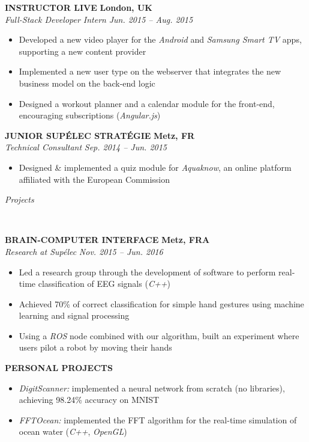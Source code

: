 \documentclass[a4paper, 12pt]{article}
\newcommand{\marginline}{-0.3cm}
\newcommand{\margincontent}{-0.6cm}
\newcommand{\marginbeforesection}{0.35cm}
\newcommand{\linewidthperso}{0.02cm}
\newcommand{\styletitle}[1]{\textbf{#1}}
\newcommand{\styledesc}[1]{\textit{#1}}
\newcommand{\styleloc}[1]{\textbf{#1}}
\newcommand{\styledates}[1]{\textit{#1}}
\newcommand{\stylesection}[1]{
  \vspace{\marginbeforesection}
  \begin{normalsize}\textit{#1}\end{normalsize}
  \vspace{\marginline}\\
  \noindent\makebox[\linewidth]{\rule{\textwidth}{\linewidthperso}}

}
\begin{document}
\begin{footnotesize}
\styletitle{INSTRUCTOR LIVE} \hfill \styleloc{London, UK}\\
\styledesc{Full-Stack Developer Intern} \hfill \styledates{Jun. 2015 -- Aug. 2015}\\
\vspace{\margincontent}
\begin{itemize}
  \item Developed a new video player for the \textit{Android} and \textit{Samsung Smart TV} apps, supporting a new content provider
  \item Implemented a new user type on the webserver that integrates the new business model on the back-end logic
  \item Designed a workout planner and a calendar module for the front-end, encouraging subscriptions (\textit{Angular.js})
\end{itemize}

\styletitle{JUNIOR SUP\'ELEC STRAT\'EGIE} \hfill \styleloc{Metz, FR}\\
\styledesc{Technical Consultant} \hfill \styledates{Sep. 2014 -- Jun. 2015}\\
\vspace{\margincontent}
\begin{itemize}
  \item Designed \& implemented a quiz module for \textit{Aquaknow}, an online platform affiliated with the European Commission
\end{itemize}

\stylesection{Projects}
   
\styletitle{BRAIN-COMPUTER INTERFACE} \hfill \styleloc{Metz, FRA}\\
\styledesc{Research at Sup\'elec} \hfill \styledates{Nov. 2015 -- Jun. 2016}\\
\vspace{\margincontent}
\begin{itemize}
  \item Led a research group through the development of software to perform real-time classification of EEG signals (\textit{C++}) 
  \item Achieved 70\% of correct classification for simple hand gestures using machine learning and signal processing
  \item Using a \textit{ROS} node combined with our algorithm, built an experiment where users pilot a robot by moving their hands 
\end{itemize}

\styletitle{PERSONAL PROJECTS}\\
\vspace{\margincontent}
\begin{itemize}
  \item \textit{DigitScanner:} implemented a neural network from scratch (no libraries), achieving 98.24\% accuracy on MNIST
  \item \textit{FFTOcean:} implemented the FFT algorithm for the real-time simulation of ocean water (\textit{C++}, \textit{OpenGL})
\end{itemize}


\end{footnotesize}
\end{document}
